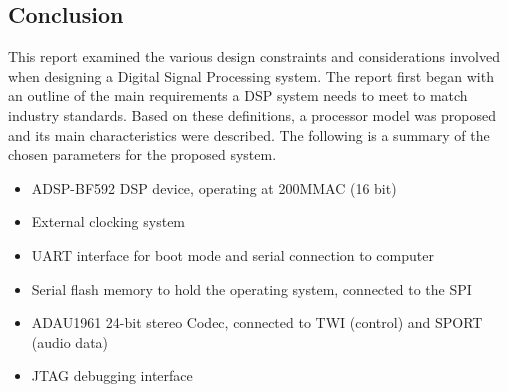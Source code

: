 \subsection{Conclusion}
This report examined the various design constraints and considerations involved when designing a Digital Signal Processing system. The report first began with an outline of the main requirements a DSP system needs to meet to match industry standards. Based on these definitions, a processor model was proposed and its main characteristics were described. The following is a summary of the chosen parameters for the proposed system. 


\begin{itemize}
	\setlength\itemsep{0.1em}
	\item ADSP-BF592 DSP device, operating at 200MMAC (16 bit)
	\item External clocking system 
	\item UART interface for boot mode and serial connection to computer 
	\item Serial flash memory to hold the operating system, connected to the SPI 
	\item ADAU1961 24-bit stereo Codec, connected to TWI (control) and SPORT (audio data)
	\item JTAG debugging interface
\end{itemize}
